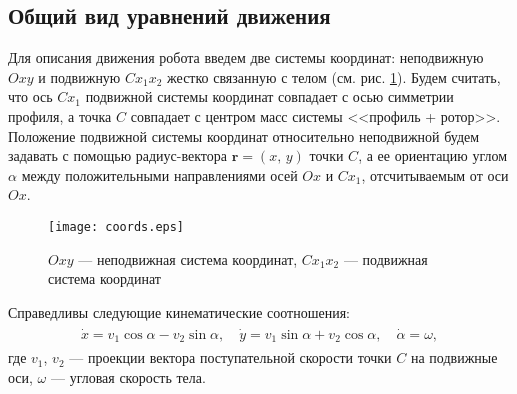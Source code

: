 	
	
	
	

\subsection{Общий вид уравнений движения}



Для описания движения робота введем две системы координат: неподвижную $Oxy$ и подвижную $Cx_1x_2$ жестко связанную с телом (см. рис. \ref{fig.coords}). Будем считать, что ось $Cx_1$ подвижной системы координат совпадает с осью симметрии профиля, а точка $C$ совпадает с центром масс системы <<профиль + ротор>>. Положение подвижной системы координат относительно неподвижной будем задавать с помощью радиус-вектора $\bm r = (x,\, y)$ точки $C$, а ее ориентацию углом $\alpha$ между положительными направлениями осей $Ox$ и $Cx_1$, отсчитываемым от оси $Ox$.

\begin{figure}[h!]
	\centering
	\texttt{[image: coords.eps]}
	\caption{$Oxy$ --- неподвижная система координат, $Cx_1x_2$ --- подвижная система координат}\label{fig.coords}
\end{figure}

Справедливы следующие кинематические соотношения:
\begin{gather}
\begin{gathered}
\dot{x} = v_1 \cos\alpha - v_2 \sin\alpha,\quad \dot{y} = v_1 \sin\alpha + v_2 \cos\alpha,\quad \dot{\alpha} = \omega,
\end{gathered}\label{eq.kinem}
\end{gather}
где $v_1$, $v_2$ --- проекции вектора поступательной скорости точки $C$ на подвижные оси, $\omega$ --- угловая скорость тела.

